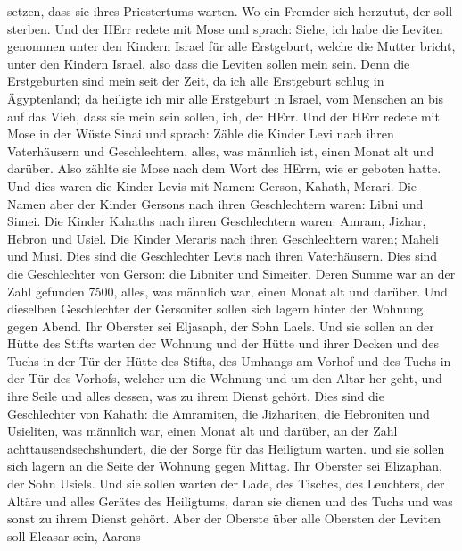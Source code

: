 setzen, dass sie ihres Priestertums warten. Wo ein Fremder sich
herzutut, der soll sterben.  Und der HErr redete mit Mose
und sprach:  Siehe, ich habe die Leviten genommen unter den
Kindern Israel für alle Erstgeburt, welche die Mutter bricht, unter den
Kindern Israel, also dass die Leviten sollen mein sein. 
Denn die Erstgeburten sind mein seit der Zeit, da ich alle Erstgeburt
schlug in Ägyptenland; da heiligte ich mir alle Erstgeburt in Israel,
vom Menschen an bis auf das Vieh, dass sie mein sein sollen, ich, der
HErr.  Und der HErr redete mit Mose in der Wüste Sinai und
sprach:  Zähle die Kinder Levi nach ihren Vaterhäusern und
Geschlechtern, alles, was männlich ist, einen Monat alt und darüber.
 Also zählte sie Mose nach dem Wort des HErrn, wie er
geboten hatte.  Und dies waren die Kinder Levis mit Namen:
Gerson, Kahath, Merari.  Die Namen aber der Kinder Gersons
nach ihren Geschlechtern waren: Libni und Simei.  Die
Kinder Kahaths nach ihren Geschlechtern waren: Amram, Jizhar, Hebron und
Usiel.  Die Kinder Meraris nach ihren Geschlechtern waren;
Maheli und Musi. Dies sind die Geschlechter Levis nach ihren
Vaterhäusern.  Dies sind die Geschlechter von Gerson: die
Libniter und Simeiter.  Deren Summe war an der Zahl
gefunden 7500, alles, was männlich war, einen Monat alt und darüber.
 Und dieselben Geschlechter der Gersoniter sollen sich
lagern hinter der Wohnung gegen Abend.  Ihr Oberster sei
Eljasaph, der Sohn Laels.  Und sie sollen an der Hütte des
Stifts warten der Wohnung und der Hütte und ihrer Decken und des Tuchs
in der Tür der Hütte des Stifts,  des Umhangs am Vorhof und
des Tuchs in der Tür des Vorhofs, welcher um die Wohnung und um den
Altar her geht, und ihre Seile und alles dessen, was zu ihrem Dienst
gehört.  Dies sind die Geschlechter von Kahath: die
Amramiten, die Jizhariten, die Hebroniten und Usieliten, 
was männlich war, einen Monat alt und darüber, an der Zahl
achttausendsechshundert, die der Sorge für das Heiligtum warten.
 und sie sollen sich lagern an die Seite der Wohnung gegen
Mittag.  Ihr Oberster sei Elizaphan, der Sohn Usiels.
 Und sie sollen warten der Lade, des Tisches, des
Leuchters, der Altäre und alles Gerätes des Heiligtums, daran sie dienen
und des Tuchs und was sonst zu ihrem Dienst gehört.  Aber
der Oberste über alle Obersten der Leviten soll Eleasar sein, Aarons
